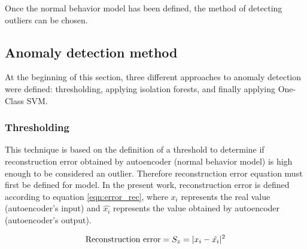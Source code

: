 \vspace{5mm} %

Once the normal behavior model has been defined, the method of detecting outliers can be chosen.

\subsection{Anomaly detection method}

At the beginning of this section, three different approaches to anomaly detection were defined: thresholding, applying isolation forests, and finally applying One-Class SVM.

\subsubsection{Thresholding}

This technique is based on the definition of a threshold to determine if reconstruction error obtained by autoencoder (normal behavior model) is high enough to be considered an outlier. Therefore reconstruction error equation must first be defined for model. In the present work, reconstruction error is defined according to equation \ref{eqn:error_rec}, where $x_{i}$ represents the real value (autoencoder's input) and $\hat{x_{i}}$ represents the value obtained by autoencoder (autoencoder's output).

\begin{equation}
\textup{Reconstruction error} = S_{z} = |x_{i} - \hat{x_{i}}|^{2} 
\label{eqn:error_rec}
\end{equation}

